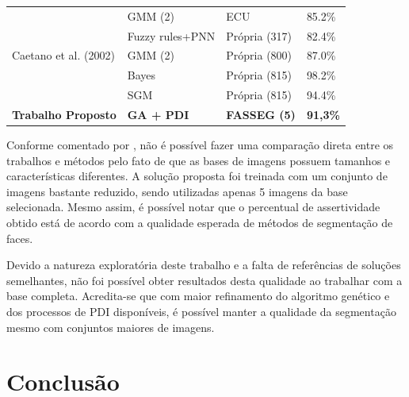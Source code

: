 \documentclass[12pt,oneside,a4paper,english,french,spanish,brazil,]{abntex2}
\begin{document}
\begin{table}
\begin{tabular}{llll}
                             & GMM (2)                        & ECU                   & 85.2\%              \\
\citet{anagnostopoulos:2003} & Fuzzy rules+PNN               & Própria (317) & 82.4\%              \\
Caetano et al. (2002)\nocite{caetano:2002}         & GMM (2)                        & Própria (800) & 87.0\%              \\
\citet{jayaram:2004}         & Bayes                          & Própria (815) & 98.2\%              \\
                             & SGM                            & Própria (815) & 94.4\%              \\ \hline
\textbf{Trabalho Proposto} & \textbf{GA + PDI} & \textbf{FASSEG (5)} & \textbf{91,3\%} \\ \hline
\end{tabular}
\end{table}

Conforme comentado por \citet{kakumanu:2007}, não é possível fazer uma comparação direta entre os trabalhos e métodos pelo fato de que as bases de imagens possuem tamanhos e características diferentes. A solução proposta foi treinada com um conjunto de imagens bastante reduzido, sendo utilizadas apenas 5 imagens da base selecionada. Mesmo assim, é possível notar que o percentual de assertividade obtido está de acordo com a qualidade esperada de métodos de segmentação de faces.

Devido a natureza exploratória deste trabalho e a falta de referências de soluções semelhantes, não foi possível obter resultados desta qualidade ao trabalhar com a base completa. Acredita-se que com maior refinamento do algoritmo genético e dos processos de PDI disponíveis, é possível manter a qualidade da segmentação mesmo com conjuntos maiores de imagens.


% 

\chapter{Conclusão}
\label{chap:Conclusao}
\label{chap:ultimo}
\end{document}
